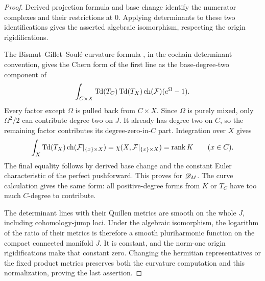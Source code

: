 
\begin{proof}
Derived projection formula and base change identify the numerator
complexes and their restrictions at \(0\). Applying determinants
to these two identifications gives the asserted algebraic
isomorphism, respecting the origin rigidifications.

The Bismut--Gillet--Soulé curvature formula
\cite[Theorem~0.1]{BGS}, in the cochain determinant convention,
gives the Chern form of the first line as the base-degree-two
component of
\[
 \int_{C\times X}\operatorname{Td}(T_C)\operatorname{Td}(T_X)\operatorname{ch}(\mathcal F)
                          (e^\Omega-1).
\]
Every factor except \(\Omega\) is pulled back from \(C\times X\).
Since \(\Omega\) is purely mixed, only \(\Omega^2/2\) can
contribute degree two on \(J\). It already has degree two on
\(C\), so the remaining factor contributes its degree-zero-in-\(C\)
part. Integration over \(X\) gives
\[
 \int_X\operatorname{Td}(T_X)\operatorname{ch}(\mathcal F|_{\{x\}\times X})
       =\chi(X,\mathcal F|_{\{x\}\times X})=\operatorname{rank} K
 \qquad(x\in C).
\]
The final equality follows by derived base change and the constant
Euler characteristic of the perfect pushforward. This proves
 for \(\mathscr D_M\). The curve
calculation gives the same form: all positive-degree forms from
\(K\) or \(T_C\) have too much \(C\)-degree to contribute.

The determinant lines with their Quillen metrics are smooth on
the whole \(J\), including cohomology-jump loci. Under the
algebraic isomorphism, the logarithm of the ratio of their metrics
is therefore a smooth pluriharmonic function on the compact
connected manifold \(J\). It is constant, and the norm-one
origin rigidifications make that constant zero. Changing the
hermitian representatives or the fixed product metrics preserves both the
curvature computation and this normalization, proving the last
assertion.
\end{proof}

